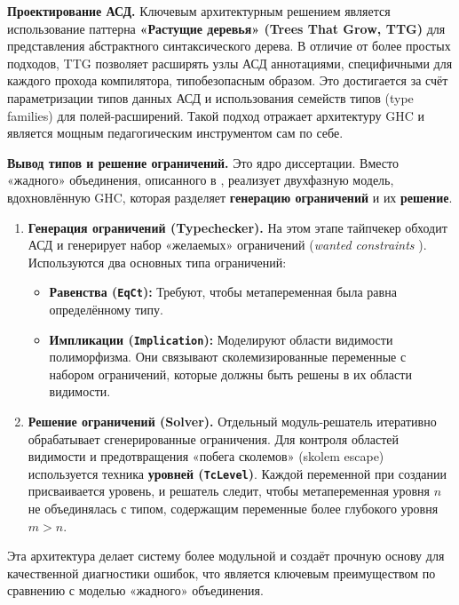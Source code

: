 \textbf{Проектирование АСД.} Ключевым архитектурным решением является использование паттерна \textbf{«Растущие деревья» (Trees That Grow, TTG)} \cite{trees-that-grow-2016} для представления абстрактного синтаксического дерева. В отличие от более простых подходов, TTG позволяет расширять узлы АСД аннотациями, специфичными для каждого прохода компилятора, типобезопасным образом. Это достигается за счёт параметризации типов данных АСД и использования семейств типов (type families) для полей-расширений. Такой подход отражает архитектуру GHC \cite{ghc-gitlab-2025} и является мощным педагогическим инструментом сам по себе.

\textbf{Вывод типов и решение ограничений.} Это ядро диссертации. Вместо «жадного» объединения, описанного в \cite{jones-practical-2007}, \Arralac реализует двухфазную модель, вдохновлённую GHC, которая разделяет \textbf{генерацию ограничений} и их \textbf{решение}.
\begin{enumerate}
    \item \textbf{Генерация ограничений (Typechecker).} На этом этапе тайпчекер обходит АСД и генерирует набор «желаемых» ограничений (\textit{wanted constraints} \cite{wits-type-inference-using-constraints}). Используются два основных типа ограничений:
    \begin{itemize}
        \item \textbf{Равенства (\texttt{EqCt}):} Требуют, чтобы метапеременная была равна определённому типу.
        \item \textbf{Импликации (\texttt{Implication}):} Моделируют области видимости полиморфизма. Они связывают сколемизированные переменные с набором ограничений, которые должны быть решены в их области видимости.
    \end{itemize}
    
    \item \textbf{Решение ограничений (Solver).} Отдельный модуль-решатель итеративно обрабатывает сгенерированные ограничения. Для контроля областей видимости и предотвращения «побега сколемов» (skolem escape) используется техника \textbf{уровней (\texttt{TcLevel})}. Каждой переменной при создании присваивается уровень, и решатель следит, чтобы метапеременная уровня $n$ не объединялась с типом, содержащим переменные более глубокого уровня $m > n$.
\end{enumerate}

Эта архитектура делает систему более модульной и создаёт прочную основу для качественной диагностики ошибок, что является ключевым преимуществом по сравнению с моделью «жадного» объединения.


